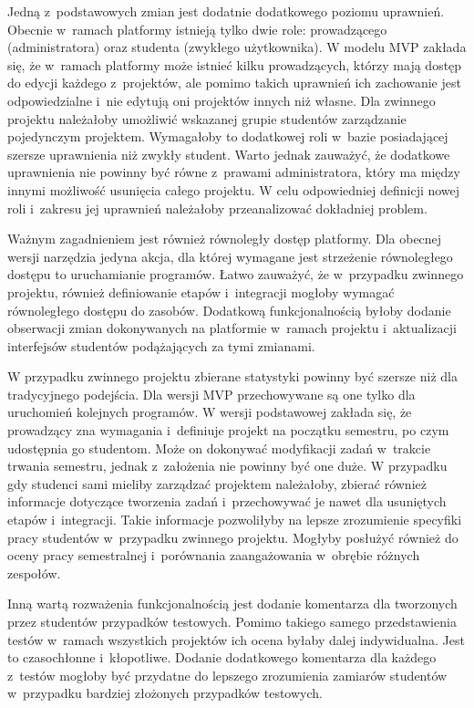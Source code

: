 Jedną z~podstawowych zmian jest dodatnie dodatkowego poziomu uprawnień.
Obecnie w~ramach platformy istnieją tylko dwie role: prowadzącego (administratora) oraz studenta (zwykłego użytkownika).
W modelu MVP zakłada się, że w~ramach platformy może istnieć kilku prowadzących, którzy mają dostęp do edycji każdego z~projektów, ale pomimo takich uprawnień ich zachowanie jest odpowiedzialne i~nie edytują oni projektów innych niż własne.
Dla zwinnego projektu należałoby umożliwić wskazanej grupie studentów zarządzanie pojedynczym projektem.
Wymagałoby to dodatkowej roli w~bazie posiadającej szersze uprawnienia niż zwykły student.
Warto jednak zauważyć, że dodatkowe uprawnienia nie powinny być równe z~prawami administratora, który ma między innymi możliwość usunięcia całego projektu.
W celu odpowiedniej definicji nowej roli i~zakresu jej uprawnień należałoby przeanalizować dokładniej problem.

Ważnym zagadnieniem jest również równoległy dostęp platformy.
Dla obecnej wersji narzędzia jedyna akcja, dla której wymagane jest strzeżenie równoległego dostępu to uruchamianie programów.
Łatwo zauważyć, że w~przypadku zwinnego projektu, również definiowanie etapów i~integracji mogłoby wymagać równoległego dostępu do zasobów.
Dodatkową funkcjonalnością byłoby dodanie obserwacji zmian dokonywanych na platformie w~ramach projektu i~aktualizacji interfejsów studentów podążających za tymi zmianami.

W przypadku zwinnego projektu zbierane statystyki powinny być szersze niż dla tradycyjnego podejścia.
Dla wersji MVP przechowywane są one tylko dla uruchomień kolejnych programów.
W wersji podstawowej zakłada się, że prowadzący zna wymagania i~definiuje projekt na początku semestru, po czym udostępnia go studentom.
Może on dokonywać modyfikacji zadań w~trakcie trwania semestru, jednak z~założenia nie powinny być one duże.
W przypadku gdy studenci sami mieliby zarządzać projektem należałoby, zbierać również informacje dotyczące tworzenia zadań i~przechowywać je nawet dla usuniętych etapów i~integracji.
Takie informacje pozwoliłyby na lepsze zrozumienie specyfiki pracy studentów w~przypadku zwinnego projektu.
Mogłyby posłużyć również do oceny pracy semestralnej i~porównania zaangażowania w~obrębie różnych zespołów.

Inną wartą rozważenia funkcjonalnością jest dodanie komentarza dla tworzonych przez studentów przypadków testowych.
Pomimo takiego samego przedstawienia testów w~ramach wszystkich projektów ich ocena byłaby dalej indywidualna.
Jest to czasochłonne i~kłopotliwe.
Dodanie dodatkowego komentarza dla każdego z~testów mogłoby być przydatne do lepszego zrozumienia zamiarów studentów w~przypadku bardziej złożonych przypadków testowych.

